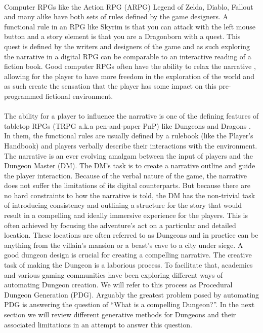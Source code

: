 \documentclass{UoYCSproject}
\begin{document}
\paragraph{}
Computer RPGs like the Action RPG (ARPG) Legend of Zelda, Diablo, Fallout and many alike have both sets of rules defined by the game designers. A functional rule in an RPG like Skyrim is that you can attack with the left mouse button and a story element is that you are a Dragonborn with a quest. This quest is defined by the writers and designers of the game and as such exploring the narrative in a digital RPG can be comparable to an interactive reading of a fiction book. Good computer RPGs often have the ability to relax the narrative \parencite{TychsenGM}, allowing for the player to have more freedom in the exploration of the world and as such create the sensation that the player has some impact on this pre-programmed fictional environment.

\paragraph{}
The ability for a player to influence the narrative is one of the defining features of tabletop RPGs (TRPG a.k.a pen-and-paper PnP) like Dungeons and Dragons \parencite{DnD}. In them, the functional rules are usually defined by a rulebook (like the Player’s Handbook) and players verbally describe their interactions with the environment. The narrative is an ever evolving amalgam between the input of players and the Dungeon Master (DM). The DM’s task is to create a narrative outline and guide the player interaction. Because of the verbal nature of the game, the narrative does not suffer the limitations of its digital counterparts. But because there are no hard constraints to how the narrative is told, the DM has the non-trivial task of introducing consistency and outlining a structure for the story that would result in a compelling and ideally immersive experience for the players. This is often achieved by focusing the adventure’s act on a particular and detailed location. These locations are often referred to as Dungeons and in practice can be anything from the villain's mansion or a beast’s cave to a city under siege. A good dungeon design is crucial for creating a compelling narrative. The creative task of making the Dungeon is a laborious process. To facilitate that, academics and various gaming communities have been exploring different ways of automating Dungeon creation. We will refer to this process as Procedural Dungeon Generation (PDG). Arguably the greatest problem posed by automating PDG is answering the question of “What is a compelling Dungeon?”. In the next section we will review different generative methods for Dungeons and their associated limitations in an attempt to answer this question.
\end{document}
